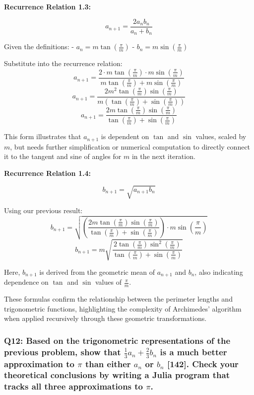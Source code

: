 \documentclass{article}
\begin{document}
\textbf{Recurrence Relation 1.3:}

\[ a_{n+1} = \frac{2a_nb_n}{a_n + b_n} \]

Given the definitions:
- \( a_n = m \tan \left( \frac{\pi}{m} \right) \)
- \( b_n = m \sin \left( \frac{\pi}{m} \right) \)

Substitute into the recurrence relation:
\[ a_{n+1} = \frac{2 \cdot m \tan \left( \frac{\pi}{m} \right) \cdot m \sin \left( \frac{\pi}{m} \right)}{m \tan \left( \frac{\pi}{m} \right) + m \sin \left( \frac{\pi}{m} \right)} \]
\[ a_{n+1} = \frac{2m^2 \tan \left( \frac{\pi}{m} \right) \sin \left( \frac{\pi}{m} \right)}{m \left(\tan \left( \frac{\pi}{m} \right) + \sin \left( \frac{\pi}{m} \right)\right)} \]
\[ a_{n+1} = \frac{2m \tan \left( \frac{\pi}{m} \right) \sin \left( \frac{\pi}{m} \right)}{\tan \left( \frac{\pi}{m} \right) + \sin \left( \frac{\pi}{m} \right)} \]

This form illustrates that \( a_{n+1} \) is dependent on \( \tan \) and \( \sin \) values, scaled by \( m \), but needs further simplification or numerical computation to directly connect it to the tangent and sine of angles for \( m \) in the next iteration.

\textbf{Recurrence Relation 1.4:}

\[ b_{n+1} = \sqrt{a_{n+1}b_n} \]

Using our previous result:
\[ b_{n+1} = \sqrt{\left(\frac{2m \tan \left( \frac{\pi}{m} \right) \sin \left( \frac{\pi}{m} \right)}{\tan \left( \frac{\pi}{m} \right) + \sin \left( \frac{\pi}{m} \right)}\right) \cdot m \sin \left( \frac{\pi}{m} \right)} \]
\[ b_{n+1} = m \sqrt{\frac{2 \tan \left( \frac{\pi}{m} \right) \sin^2 \left( \frac{\pi}{m} \right)}{\tan \left( \frac{\pi}{m} \right) + \sin \left( \frac{\pi}{m} \right)}} \]

Here, \( b_{n+1} \) is derived from the geometric mean of \( a_{n+1} \) and \( b_n \), also indicating dependence on \( \tan \) and \( \sin \) values of \( \frac{\pi}{m} \). 

These formulas confirm the relationship between the perimeter lengths and trigonometric functions, highlighting the complexity of Archimedes' algorithm when applied recursively through these geometric transformations.

\subsubsection*{Q12: Based on the trigonometric representations of the previous problem, show that $\frac{1}{3}a_n + \frac{2}{3}b_n$ is a much better approximation to $\pi$ than either $a_n$ or $b_n$ [142]. Check your theoretical conclusions by writing a Julia program that tracks all three approximations to $\pi$.}
\end{document}
